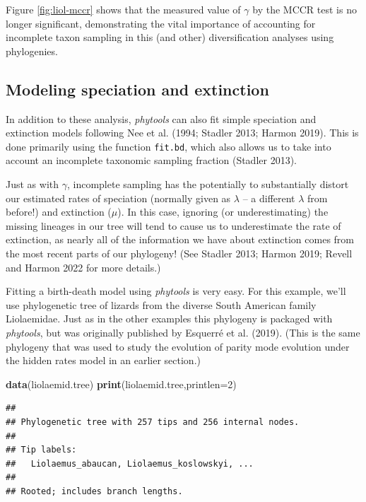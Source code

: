 \documentclass[fleqn,10pt,lineno]{wlpeerj} %
\newenvironment{Shaded}{\begin{snugshade}}{\end{snugshade}}
\newcommand{\AttributeTok}[1]{\textcolor[rgb]{0.13,0.29,0.53}{#1}}
\newcommand{\DecValTok}[1]{\textcolor[rgb]{0.00,0.00,0.81}{#1}}
\newcommand{\FunctionTok}[1]{\textcolor[rgb]{0.13,0.29,0.53}{\textbf{#1}}}
\newcommand{\NormalTok}[1]{#1}
\begin{document}
Figure \ref{fig:liol-mccr} shows that the measured value of \(\gamma\) by the MCCR test is no longer significant, demonstrating the vital importance of accounting for incomplete taxon sampling in this (and other) diversification analyses using phylogenies.

\hypertarget{modeling-speciation-and-extinction}{%
\subsection{Modeling speciation and extinction}\label{modeling-speciation-and-extinction}}

In addition to these analysis, \emph{phytools} can also fit simple speciation and extinction models following Nee et al. (1994; Stadler 2013; Harmon 2019). This is done primarily using the function \texttt{fit.bd}, which also allows us to take into account an incomplete taxonomic sampling fraction (Stadler 2013).

Just as with \(\gamma\), incomplete sampling has the potentially to substantially distort our estimated rates of speciation (normally given as \(\lambda\) -- a different \(\lambda\) from before!) and extinction (\(\mu\)). In this case, ignoring (or underestimating) the missing lineages in our tree will tend to cause us to underestimate the rate of extinction, as nearly all of the information we have about extinction comes from the most recent parts of our phylogeny! (See Stadler 2013; Harmon 2019; Revell and Harmon 2022 for more details.)

Fitting a birth-death model using \emph{phytools} is very easy. For this example, we'll use phylogenetic tree of lizards from the diverse South American family Liolaemidae. Just as in the other examples this phylogeny is packaged with \emph{phytools}, but was originally published by Esquerré et al. (2019). (This is the same phylogeny that was used to study the evolution of parity mode evolution under the hidden rates model in an earlier section.)

\begin{Shaded}
\begin{Highlighting}[]
\FunctionTok{data}\NormalTok{(liolaemid.tree)}
\FunctionTok{print}\NormalTok{(liolaemid.tree,}\AttributeTok{printlen=}\DecValTok{2}\NormalTok{)}
\end{Highlighting}
\end{Shaded}

\begin{verbatim}
## 
## Phylogenetic tree with 257 tips and 256 internal nodes.
## 
## Tip labels:
##   Liolaemus_abaucan, Liolaemus_koslowskyi, ...
## 
## Rooted; includes branch lengths.
\end{verbatim}
\end{document}
